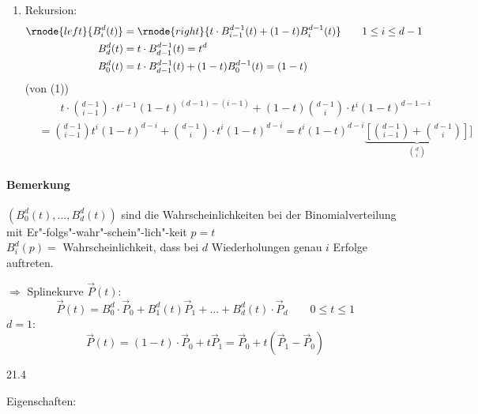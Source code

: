 \begin{itemize}
\begin{enumerate}
	 \item Rekursion:
		\begin{align*}
		\rnode{left}{B_i^d(t)} &= \rnode{right}{t \cdot B_{i-1}^{d-1}(t) + (1-t)B_i^{d-1}(t)} \qquad 1 \le i \le d - 1\\
		 B_d^d(t) &= t \cdot B_{d-1}^{d-1}(t)	= t^d \\
		 B_0^d(t) &= t \cdot B_{d-1}^{d-1}(t) + (1-t) B_0^{d-1}(t) = (1-t)
		\end{align*}
		\Bew (von (1))
			\begin{align*}
			 & \qquad t \cdot \binom{d-1}{i-1} \cdot t^{i-1} (1-t)^{(d-1)-(i-1)} + (1-t) \binom{d-1}{i} \cdot
				t^{i} (1-t)^{d-1-i}\\
			 &= \binom{d-1}{i-1}t^i (1-t)^{d-i} + \binom{d-1}{i} \cdot t^i (1-t)^{d-i}
				= t^i (1-t)^{d-i} \underbrace{\left[\binom{d-1}{i-1}+ \binom{d-1}{i}\right]}_{\binom{d}{i}}]
			\end{align*}
	\end{enumerate}
	\paragraph*{Bemerkung} $(B_0^d(t), ..., B_d^d(t))$ sind die Wahrscheinlichkeiten bei der Binomialverteilung mit
	Er"-folgs"-wahr"-schein"-lich"-keit $p = t$\\[1em]
	$B_i^d(p) =$ Wahrscheinlichkeit, dass bei $d$ Wiederholungen genau $i$ Erfolge auftreten.
\end{itemize}
$\Rightarrow$ Splinekurve $\vec P(t)$:
\[
 \boxed{\vec P(t) = B_0^d \cdot \vec P_0 + B_1^d(t) \vec P_1 + ... + B_d^d(t) \cdot \vec P_d} \qquad 0 \le t \le 1
\]
$d = 1$:
\[\vec P(t) = (1-t) \cdot \vec P_0 + t \vec P_1 = \vec P_0 + t(\vec P_1 - \vec P_0)\]
\begin{center}
 21.4
\end{center}
Eigenschaften:
